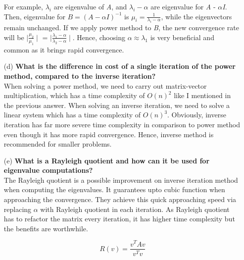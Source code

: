 \documentclass[unicode,11pt,a4paper,oneside,numbers=endperiod,openany]{scrartcl}
\begin{document}
\begin{enumerate}
{For example, $\lambda_i$ are eigenvalue of \textit{A}, and $\lambda_i - \alpha$ are eigenvalue for \textit{A} - $\alpha$\textit{I}. Then, eigenvalue for $\textit{B} = (\textit{A} - \alpha\textit{I})^{-1}$ is $\mu_i = \frac{1}{\lambda_i - \alpha}$, while the eigenvectors remain unchanged.
If we apply power method to \textit{B}, the new convergence rate will be $\mid \frac{\mu_2}{\mu_1} \mid$ = $\mid \frac{\lambda_1 - \alpha}{\lambda_2 - \alpha} \mid$. Hence, choosing $\alpha \approx \lambda_1$ is very beneficial and common as it brings rapid convergence. }
\item[(d)] \textbf{What is the difference in cost of a single iteration of the power method, compared to the inverse iteration?}\\
{When solving a power method, we need to carry out matrix-vector multiplication, which has a time complexity of $O(n)^{2}$ like I mentioned in the previous answer. When solving an inverse iteration, we need to solve a linear system which has a time complexity of $O(n)^{3}$. Obviously, inverse iteration has far more severe time complexity in comparison to power method even though it has more rapid convergence. Hence, inverse method is recommended for smaller problems.}
\item[(e)] \textbf{What is a Rayleigh quotient and how can it be used for eigenvalue computations?}\\
{The Rayleigh quotient is a possible improvement on inverse iteration method when computing the eigenvalues. It guarantees upto cubic function when approaching the convergence. They achieve this quick approaching speed via replacing $\alpha$ with Rayleigh quotient in each iteration. As Rayleigh quotient has to refactor the matrix every iteration, it has higher time complexity but the benefits are worthwhile.}
\begin{center}
\begin{equation}
 R(v) = \frac{v^{T}Av}{v^{T}v}
\end{equation}
\end{center}

\end{enumerate}
\end{document}
